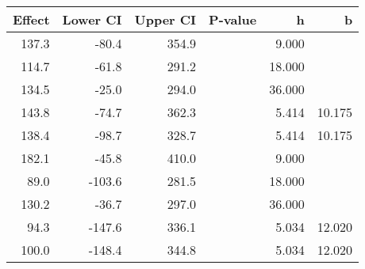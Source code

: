 \begin{table}[ht]
\centering
\begin{tabular}{rrrrrr}
  \hline
Effect & Lower CI & Upper CI & P-value & h & b \\ 
  \hline
137.3 & -80.4 & 354.9 &  & 9.000 &  \\ 
  114.7 & -61.8 & 291.2 &  & 18.000 &  \\ 
  134.5 & -25.0 & 294.0 &  & 36.000 &  \\ 
  143.8 & -74.7 & 362.3 &  & 5.414 & 10.175 \\ 
  138.4 & -98.7 & 328.7 &  & 5.414 & 10.175 \\ 
  182.1 & -45.8 & 410.0 &  & 9.000 &  \\ 
  89.0 & -103.6 & 281.5 &  & 18.000 &  \\ 
  130.2 & -36.7 & 297.0 &  & 36.000 &  \\ 
  94.3 & -147.6 & 336.1 &  & 5.034 & 12.020 \\ 
  100.0 & -148.4 & 344.8 &  & 5.034 & 12.020 \\ 
   \hline
\end{tabular}
\end{table}
